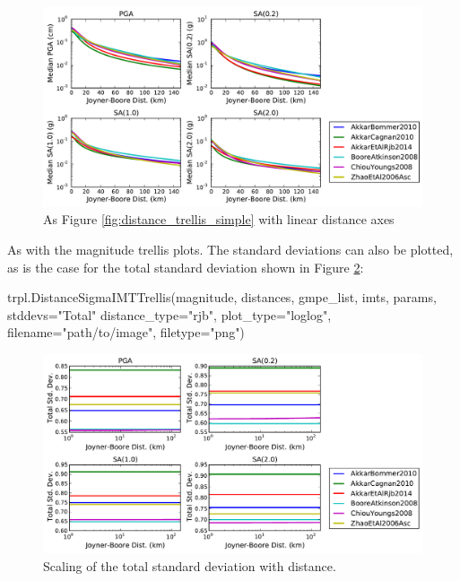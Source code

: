 \begin{figure}[htbp]
	\centering
		\includegraphics[width=\textwidth]{./figures/trellis/distance_linear_trellis_simple.pdf}
	\caption{As Figure \ref{fig:distance_trellis_simple} with linear distance axes}
	\label{fig:distance_linear_trellis}
\end{figure}

As with the magnitude trellis plots. The standard deviations can also be plotted, as is the case for the total standard deviation shown in Figure \ref{fig:distance_sigma_trellis}:

\begin{python}
trpl.DistanceSigmaIMTTrellis(magnitude,
                             distances, 
                             gmpe_list,
                             imts,
                             params,
                             stddevs="Total"
                             distance_type="rjb",
                             plot_type="loglog",
                             filename="path/to/image",
                             filetype="png")
\end{python}
\begin{figure}[htbp]
	\centering
		\includegraphics[width=\textwidth]{./figures/trellis/distance_total_sigma_imt_trellis_simple.pdf}
	\caption{Scaling of the total standard deviation with distance.}
	\label{fig:distance_sigma_trellis}
\end{figure}

